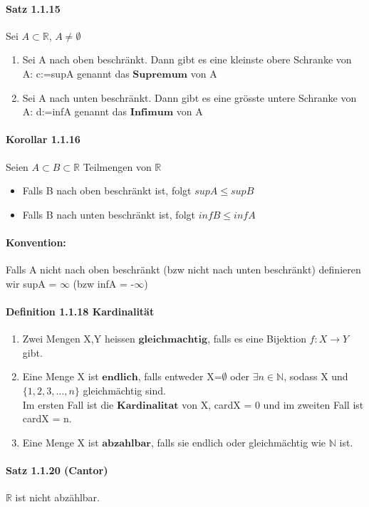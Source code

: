 \documentclass[8pt]{extreport}
\begin{document}
\paragraph{Satz 1.1.15} Sei $A \subset \mathbb{R}$, $A\neq \emptyset$
\begin{enumerate}
\item Sei A nach oben beschränkt. Dann gibt es eine kleinste obere Schranke von A: c:=supA genannt das $\mathbf{Supremum}$ von A
\item Sei A nach unten beschränkt. Dann gibt es eine grösste untere Schranke von A: d:=infA genannt das $\mathbf{Infimum}$ von A
\end{enumerate}
\paragraph{Korollar 1.1.16} Seien $A\subset B \subset \mathbb{R}$ Teilmengen von $\mathbb{R}$
\begin{itemize}
\item Falls B nach oben beschränkt ist, folgt $supA \leq supB$
\item Falls B nach unten beschränkt ist, folgt $infB \leq infA$
\end{itemize}
\paragraph{Konvention:} Falls A nicht nach oben beschränkt (bzw nicht nach unten beschränkt) definieren wir supA = $\infty$ (bzw infA = -$\infty$)
\paragraph{Definition 1.1.18 Kardinalität}
\begin{enumerate}
\item Zwei Mengen X,Y heissen $\mathbf{gleichmachtig}$, falls es eine Bijektion $f:X\rightarrow Y$ gibt.
\item Eine Menge X ist $\mathbf{endlich}$, falls entweder X=$\emptyset$ oder $\exists n \in \mathbb{N}$, sodass X und $\{1,2,3,\dots,n\}$ gleichmächtig sind.\\ Im ersten Fall ist die $\mathbf{Kardinalitat}$ von X, cardX = 0 und im zweiten Fall ist cardX = n.
\item Eine Menge X ist $\mathbf{abzahlbar}$, falls sie endlich oder gleichmächtig wie $\mathbb{N}$ ist.
\end{enumerate}
\paragraph{Satz 1.1.20 (Cantor)} $\mathbb{R}$ ist nicht abzählbar.
\end{document}
